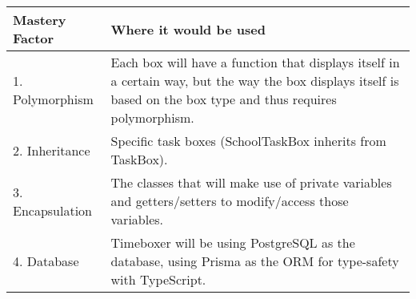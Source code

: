 \documentclass[12pt, notitlepage]{article}
\begin{document}
\noindent\begin{tabularx}{\textwidth}{|l|X|}
	\hline
	\textbf{Mastery Factor}
	 & \textbf{Where it would be used}
	\\\hline
	1. Polymorphism
	 & Each box will have a function that displays itself in a certain way, but the way the box displays itself is based on the box type and thus requires polymorphism.
	\\\hline
	2. Inheritance
	 & Specific task boxes (SchoolTaskBox inherits from TaskBox).
	\\\hline
	3. Encapsulation
	 & The classes that will make use of private variables and getters/setters to modify/access those variables.
	\\\hline
	4. Database
	 & Timeboxer will be using PostgreSQL as the database, using Prisma as the ORM for type-safety with TypeScript.
	\\\hline
\end{tabularx}
\end{document}
